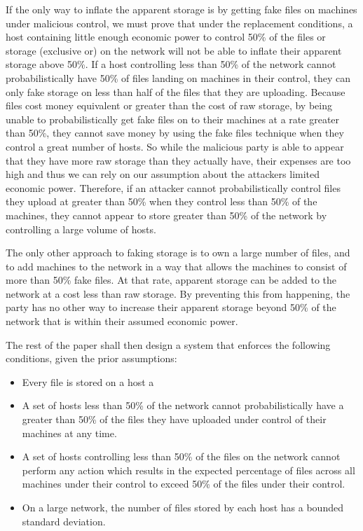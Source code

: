 \documentclass[twocolumn]{article}
\begin{document}
If the only way to inflate the apparent storage is by getting fake files on machines under malicious control, we must prove that under the replacement conditions, a host containing little enough economic power to control 50\% of the files or storage (exclusive or) on the network will not be able to inflate their apparent storage above 50\%.
If a host controlling less than 50\% of the network cannot probabilistically have 50\% of files landing on machines in their control, they can only fake storage on less than half of the files that they are uploading.
Because files cost money equivalent or greater than the cost of raw storage, by being unable to probabilistically get fake files on to their machines at a rate greater than 50\%, they cannot save money by using the fake files technique when they control a great number of hosts.
So while the malicious party is able to appear that they have more raw storage than they actually have, their expenses are too high and thus we can rely on our assumption about the attackers limited economic power.
Therefore, if an attacker cannot probabilistically control files they upload at greater than 50\% when they control less than 50\% of the machines, they cannot appear to store greater than 50\% of the network by controlling a large volume of hosts.

The only other approach to faking storage is to own a large number of files, and to add machines to the network in a way that allows the machines to consist of more than 50\% fake files.
At that rate, apparent storage can be added to the network at a cost less than raw storage.
By preventing this from happening, the party has no other way to increase their apparent storage beyond 50\% of the network that is within their assumed economic power.

The rest of the paper shall then design a system that enforces the following conditions, given the prior assumptions:
\begin{itemize}
	\item Every file is stored on a host
	a\item A set of hosts less than 50\% of the network cannot probabilistically have a greater than 50\% of the files they have uploaded under control of their machines at any time.
	\item A set of hosts controlling less than 50\% of the files on the network cannot perform any action which results in the expected percentage of files across all machines under their control to exceed 50\% of the files under their control.
	\item On a large network, the number of files stored by each host has a bounded standard deviation.
\end{itemize}
\end{document}
